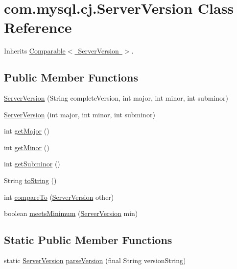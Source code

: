 \hypertarget{classcom_1_1mysql_1_1cj_1_1_server_version}{}\section{com.\+mysql.\+cj.\+Server\+Version Class Reference}
\label{classcom_1_1mysql_1_1cj_1_1_server_version}


Inherits \mbox{\hyperlink{class_comparable}{Comparable$<$ Server\+Version $>$}}.

\subsection*{Public Member Functions}
\begin{DoxyCompactItemize}
\item 
\mbox{\hyperlink{classcom_1_1mysql_1_1cj_1_1_server_version_a958c017aeaff68e3129d98c08c9428bc}{Server\+Version}} (String complete\+Version, int major, int minor, int subminor)
\item 
\mbox{\hyperlink{classcom_1_1mysql_1_1cj_1_1_server_version_a7c16c47ebd3efda6d118efed484aed12}{Server\+Version}} (int major, int minor, int subminor)
\item 
int \mbox{\hyperlink{classcom_1_1mysql_1_1cj_1_1_server_version_afaaface05180f229b80bdd95c0a11113}{get\+Major}} ()
\item 
int \mbox{\hyperlink{classcom_1_1mysql_1_1cj_1_1_server_version_a53bc82dac08a5c6446b1750ef48872eb}{get\+Minor}} ()
\item 
int \mbox{\hyperlink{classcom_1_1mysql_1_1cj_1_1_server_version_a753b8e6fb4e9546cb331dd6b3b2d70e4}{get\+Subminor}} ()
\item 
String \mbox{\hyperlink{classcom_1_1mysql_1_1cj_1_1_server_version_ac6732acde7ab4125a366f4c6d2f957f0}{to\+String}} ()
\item 
int \mbox{\hyperlink{classcom_1_1mysql_1_1cj_1_1_server_version_a4c7863cc27ebd138be35a2959eb2adb4}{compare\+To}} (\mbox{\hyperlink{classcom_1_1mysql_1_1cj_1_1_server_version}{Server\+Version}} other)
\item 
boolean \mbox{\hyperlink{classcom_1_1mysql_1_1cj_1_1_server_version_abc8b53b9a5a5bf7acc4665d620c07fda}{meets\+Minimum}} (\mbox{\hyperlink{classcom_1_1mysql_1_1cj_1_1_server_version}{Server\+Version}} min)
\end{DoxyCompactItemize}
\subsection*{Static Public Member Functions}
\begin{DoxyCompactItemize}
\item 
static \mbox{\hyperlink{classcom_1_1mysql_1_1cj_1_1_server_version}{Server\+Version}} \mbox{\hyperlink{classcom_1_1mysql_1_1cj_1_1_server_version_a058b132076121d8763c12432b943b219}{parse\+Version}} (final String version\+String)
\end{DoxyCompactItemize}


